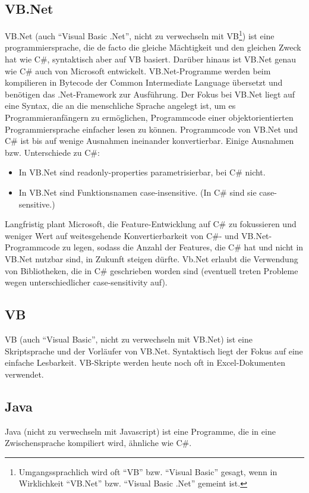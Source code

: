 \begin{multicols}{3}
\subsection{VB.Net}
VB.Net (auch \enquote{Visual Basic .Net}, nicht zu verwechseln mit VB\footnote{Umgangssprachlich wird oft \enquote{VB} bzw. \enquote{Visual Basic} gesagt, wenn in Wirklichkeit \enquote{VB.Net} bzw. \enquote{Visual Basic .Net} gemeint ist.}) ist eine programmiersprache, die de facto die gleiche Mächtigkeit und den gleichen Zweck hat wie C\#, syntaktisch aber auf VB basiert. Darüber hinaus ist VB.Net genau wie C\# auch von Microsoft entwickelt. VB.Net-Programme werden beim kompilieren in Bytecode der Common Intermediate Language übersetzt und benötigen das .Net-Framework zur Ausführung. Der Fokus bei VB.Net liegt auf eine Syntax, die an die menschliche Sprache angelegt ist, um es Programmieranfängern zu ermöglichen, Programmcode einer objektorientierten Programmiersprache einfacher lesen zu können. Programmcode von VB.Net und C\# ist bis auf wenige Ausnahmen ineinander konvertierbar. Einige Ausnahmen bzw. Unterschiede zu C\#:\\
\begin{itemize}
\item In VB.Net sind readonly-properties parametrisierbar, bei C\# nicht.
\item In VB.Net sind Funktionsnamen case-insensitive. (In C\# sind sie case-sensitive.)
\end{itemize}
Langfristig plant Microsoft, die Feature-Entwicklung auf C\# zu fokussieren und weniger Wert auf weitesgehende Konvertierbarkeit von C\#- und VB.Net-Programmcode zu legen, sodass die Anzahl der Features, die C\# hat und nicht in VB.Net nutzbar sind, in Zukunft steigen dürfte. Vb.Net erlaubt die Verwendung von Bibliotheken, die in C\# geschrieben worden sind (eventuell treten Probleme wegen unterschiedlicher case-sensitivity auf).
\subsection{VB}
VB (auch \enquote{Visual Basic}, nicht zu verwechseln mit VB.Net) ist eine Skriptsprache und der Vorläufer von VB.Net. Syntaktisch liegt der Fokus auf eine einfache Lesbarkeit. VB-Skripte werden heute noch oft in Excel-Dokumenten verwendet.
\subsection{Java}
Java (nicht zu verwechseln mit Javascript) ist eine Programme, die in eine Zwischensprache kompiliert wird, ähnliche wie C\#.

\end{multicols}
